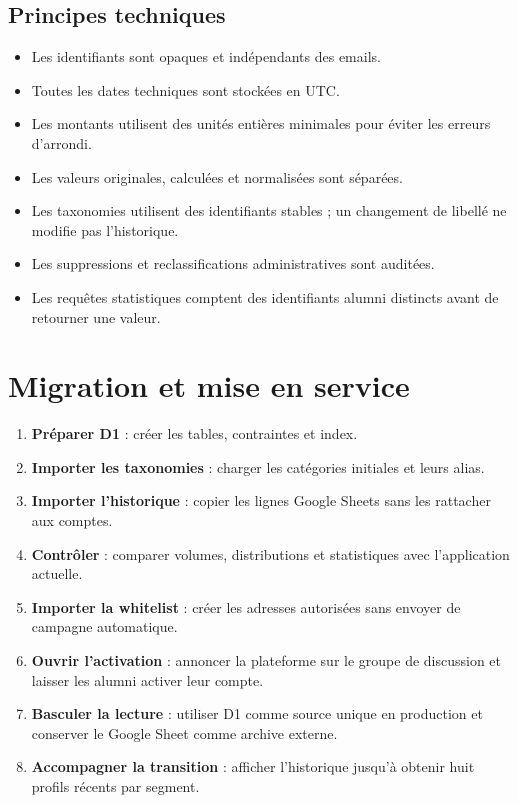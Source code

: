 \documentclass[11pt,a4paper]{article}
\begin{document}
\subsection{Principes techniques}

\begin{itemize}
  \item Les identifiants sont opaques et indépendants des emails.
  \item Toutes les dates techniques sont stockées en UTC.
  \item Les montants utilisent des unités entières minimales pour éviter les
        erreurs d'arrondi.
  \item Les valeurs originales, calculées et normalisées sont séparées.
  \item Les taxonomies utilisent des identifiants stables ; un changement de
        libellé ne modifie pas l'historique.
  \item Les suppressions et reclassifications administratives sont auditées.
  \item Les requêtes statistiques comptent des identifiants alumni distincts
        avant de retourner une valeur.
\end{itemize}

\section{Migration et mise en service}

\begin{enumerate}
  \item \textbf{Préparer D1} : créer les tables, contraintes et index.
  \item \textbf{Importer les taxonomies} : charger les catégories initiales et
        leurs alias.
  \item \textbf{Importer l'historique} : copier les lignes Google Sheets sans
        les rattacher aux comptes.
  \item \textbf{Contrôler} : comparer volumes, distributions et statistiques
        avec l'application actuelle.
  \item \textbf{Importer la whitelist} : créer les adresses autorisées sans
        envoyer de campagne automatique.
  \item \textbf{Ouvrir l'activation} : annoncer la plateforme sur le groupe de
        discussion et laisser les alumni activer leur compte.
  \item \textbf{Basculer la lecture} : utiliser D1 comme source unique en
        production et conserver le Google Sheet comme archive externe.
  \item \textbf{Accompagner la transition} : afficher l'historique jusqu'à
        obtenir huit profils récents par segment.
\end{enumerate}
\end{document}
